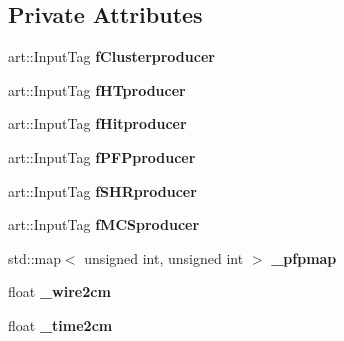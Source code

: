 \subsection*{Private Attributes}
\begin{DoxyCompactItemize}
\item 
art\+::\+Input\+Tag {\bfseries f\+Clusterproducer}\hypertarget{classSecondShowerPurity_a641801003f7a8cab0bb13efc21583739}{}\label{classSecondShowerPurity_a641801003f7a8cab0bb13efc21583739}

\item 
art\+::\+Input\+Tag {\bfseries f\+H\+Tproducer}\hypertarget{classSecondShowerPurity_aac4bc55cedfa1905dfb2c60197198007}{}\label{classSecondShowerPurity_aac4bc55cedfa1905dfb2c60197198007}

\item 
art\+::\+Input\+Tag {\bfseries f\+Hitproducer}\hypertarget{classSecondShowerPurity_a397ee926f1a3b5594fde75933b30b48b}{}\label{classSecondShowerPurity_a397ee926f1a3b5594fde75933b30b48b}

\item 
art\+::\+Input\+Tag {\bfseries f\+P\+F\+Pproducer}\hypertarget{classSecondShowerPurity_ab3ba769b6c15e325813bad206a7a2223}{}\label{classSecondShowerPurity_ab3ba769b6c15e325813bad206a7a2223}

\item 
art\+::\+Input\+Tag {\bfseries f\+S\+H\+Rproducer}\hypertarget{classSecondShowerPurity_af3cade2862986deb0c2333f7a13208ea}{}\label{classSecondShowerPurity_af3cade2862986deb0c2333f7a13208ea}

\item 
art\+::\+Input\+Tag {\bfseries f\+M\+C\+Sproducer}\hypertarget{classSecondShowerPurity_a267de14095ad791afcca1f3f2a568a87}{}\label{classSecondShowerPurity_a267de14095ad791afcca1f3f2a568a87}

\item 
std\+::map$<$ unsigned int, unsigned int $>$ {\bfseries \+\_\+pfpmap}\hypertarget{classSecondShowerPurity_af8a380f40bb05c2cb9b63ed3cfd9aa0f}{}\label{classSecondShowerPurity_af8a380f40bb05c2cb9b63ed3cfd9aa0f}

\item 
float {\bfseries \+\_\+wire2cm}\hypertarget{classSecondShowerPurity_a99010c0c89592e3dd9f696f490a1a7f7}{}\label{classSecondShowerPurity_a99010c0c89592e3dd9f696f490a1a7f7}

\item 
float {\bfseries \+\_\+time2cm}\hypertarget{classSecondShowerPurity_ac3c7bec25a10542beb5f12e1f3fc03b2}{}\label{classSecondShowerPurity_ac3c7bec25a10542beb5f12e1f3fc03b2}


\end{DoxyCompactItemize}

